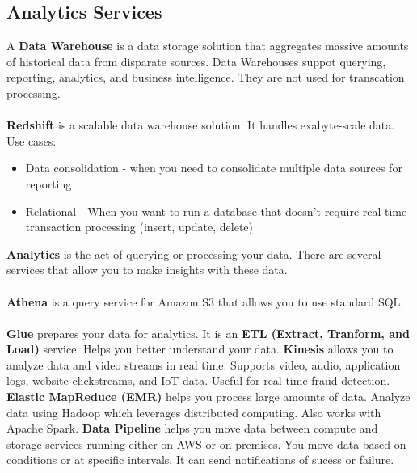 \documentclass{article}%
\begin{document}
\subsection{Analytics Services}
A \textbf{Data Warehouse} is a data storage solution that aggregates massive amounts of historical data from disparate sources. Data Warehouses suppot querying, reporting, analytics, and business intelligence. They are not used for transcation processing. \\ \\
\textbf{Redshift} is a scalable data warehouse solution. It handles exabyte-scale data. Use cases:
\begin{itemize}
    \item Data consolidation - when you need to consolidate multiple data sources for reporting
    \item Relational - When you want to run a database that doesn't require real-time transaction processing (insert, update, delete)
\end{itemize}
\textbf{Analytics} is the act of querying or processing your data. There are several services that allow you to make insights with these data. \\ \\
\textbf{Athena} is a query service for Amazon S3 that allows you to use standard SQL. \\ \\ 
\textbf{Glue} prepares your data for analytics. It is an \textbf{ETL (Extract, Tranform, and Load)} service. Helps you better understand your data.
\textbf{Kinesis} allows you to analyze data and video streams in real time. Supports video, audio, application logs, website clickstreams, and IoT data. Useful for real time fraud detection. 
\textbf{Elastic MapReduce (EMR)} helps you process large amounts of data. Analyze data using Hadoop which leverages distributed computing. Also works with Apache Spark.
\textbf{Data Pipeline} helps you move data between compute and storage services running either on AWS or on-premises. You move data based on conditions or at specific intervals. It can send notifications of sucess or failure. 
\end{document}
